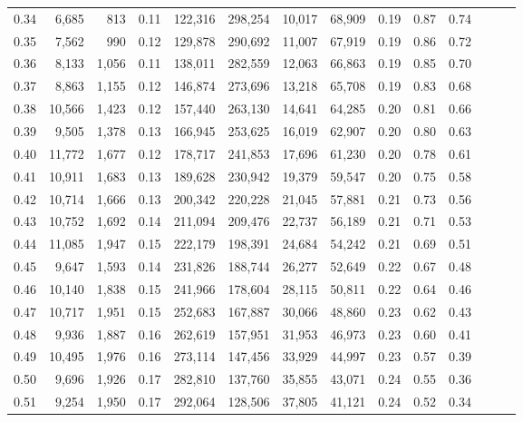 \begin{tabular}{rrrrrrrrrrrrrr}
0.34 &   6,685 &    813 &  0.11 &  122,316 &  298,254 &  10,017 &  68,909 &  0.19 &  0.87 &      0.74 \\
0.35 &   7,562 &    990 &  0.12 &  129,878 &  290,692 &  11,007 &  67,919 &  0.19 &  0.86 &      0.72 \\
0.36 &   8,133 &  1,056 &  0.11 &  138,011 &  282,559 &  12,063 &  66,863 &  0.19 &  0.85 &      0.70 \\
0.37 &   8,863 &  1,155 &  0.12 &  146,874 &  273,696 &  13,218 &  65,708 &  0.19 &  0.83 &      0.68 \\
0.38 &  10,566 &  1,423 &  0.12 &  157,440 &  263,130 &  14,641 &  64,285 &  0.20 &  0.81 &      0.66 \\
0.39 &   9,505 &  1,378 &  0.13 &  166,945 &  253,625 &  16,019 &  62,907 &  0.20 &  0.80 &      0.63 \\
0.40 &  11,772 &  1,677 &  0.12 &  178,717 &  241,853 &  17,696 &  61,230 &  0.20 &  0.78 &      0.61 \\
0.41 &  10,911 &  1,683 &  0.13 &  189,628 &  230,942 &  19,379 &  59,547 &  0.20 &  0.75 &      0.58 \\
0.42 &  10,714 &  1,666 &  0.13 &  200,342 &  220,228 &  21,045 &  57,881 &  0.21 &  0.73 &      0.56 \\
0.43 &  10,752 &  1,692 &  0.14 &  211,094 &  209,476 &  22,737 &  56,189 &  0.21 &  0.71 &      0.53 \\
0.44 &  11,085 &  1,947 &  0.15 &  222,179 &  198,391 &  24,684 &  54,242 &  0.21 &  0.69 &      0.51 \\
0.45 &   9,647 &  1,593 &  0.14 &  231,826 &  188,744 &  26,277 &  52,649 &  0.22 &  0.67 &      0.48 \\
0.46 &  10,140 &  1,838 &  0.15 &  241,966 &  178,604 &  28,115 &  50,811 &  0.22 &  0.64 &      0.46 \\
0.47 &  10,717 &  1,951 &  0.15 &  252,683 &  167,887 &  30,066 &  48,860 &  0.23 &  0.62 &      0.43 \\
0.48 &   9,936 &  1,887 &  0.16 &  262,619 &  157,951 &  31,953 &  46,973 &  0.23 &  0.60 &      0.41 \\
0.49 &  10,495 &  1,976 &  0.16 &  273,114 &  147,456 &  33,929 &  44,997 &  0.23 &  0.57 &      0.39 \\
0.50 &   9,696 &  1,926 &  0.17 &  282,810 &  137,760 &  35,855 &  43,071 &  0.24 &  0.55 &      0.36 \\
0.51 &   9,254 &  1,950 &  0.17 &  292,064 &  128,506 &  37,805 &  41,121 &  0.24 &  0.52 &      0.34 \\

\end{tabular}
